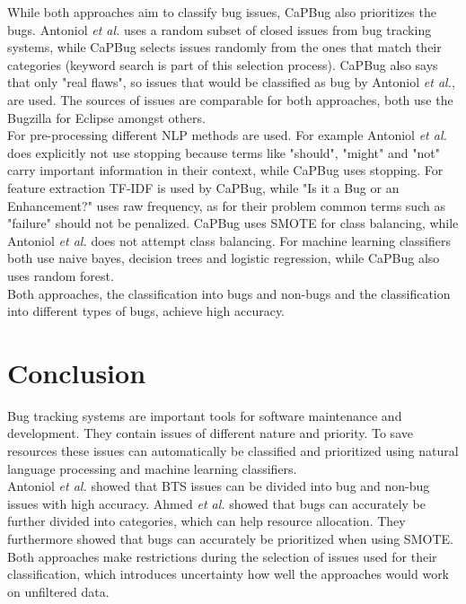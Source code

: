 While both approaches aim to classify bug issues, CaPBug also prioritizes the bugs. Antoniol \textit{et al.} uses a random subset of closed issues from bug tracking systems, while CaPBug selects issues randomly from the ones that match their categories (keyword search is part of this selection process). CaPBug also says that only "real flaws", so issues that would be classified as bug by Antoniol \textit{et al.}, are used. The sources of issues are comparable for both approaches, both use the Bugzilla for Eclipse amongst others.\\
For pre-processing different NLP methods are used. For example Antoniol \textit{et al.} does explicitly not use stopping because terms like "should", "might" and "not" carry important information in their context, while CaPBug uses stopping. For feature extraction TF-IDF is used by CaPBug, while "Is it a Bug or an Enhancement?" uses raw frequency, as for their problem common terms such as "failure" should not be penalized. CaPBug uses SMOTE for class balancing, while Antoniol \textit{et al.} does not attempt class balancing. For machine learning classifiers both use naive bayes, decision trees and logistic regression, while CaPBug also uses random forest.\\
Both approaches, the classification into bugs and non-bugs and the classification into different types of bugs, achieve high accuracy.

\section{Conclusion}

Bug tracking systems are important tools for software maintenance and development. They contain issues of different nature and priority. To save resources these issues can automatically be classified and prioritized using natural language processing and machine learning classifiers.\\
Antoniol \textit{et al.} showed that BTS issues can be divided into bug and non-bug issues with high accuracy. Ahmed \textit{et al.} showed that bugs can accurately be further divided into categories, which can help resource allocation. They furthermore showed that bugs can accurately be prioritized when using SMOTE.\\
Both approaches make restrictions during the selection of issues used for their classification, which introduces uncertainty how well the approaches would work on unfiltered data.


